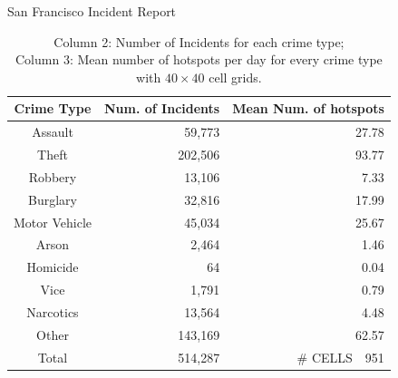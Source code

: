 \documentclass[10pt]{beamer}
\begin{document}
\begin{frame}{San Francisco Incident Report}
\begin{table}[h!]
\centering
\caption{Column 2: Number of Incidents for each crime type;
\\Column 3: Mean number of hotspots per day for every crime type with $40\times 40$ cell grids.}
{\small
 \begin{tabular}{crr} 
 \toprule
 \textbf{Crime Type} & \textbf{Num. of Incidents} & \textbf{Mean Num. of hotspots}\\ [0.5ex] 
 \midrule
Assault & 59,773 &  27.78\\ 
 Theft & 202,506 & 93.77\\
 Robbery & 13,106 & 7.33\\
 Burglary & 32,816  & 17.99\\
 Motor Vehicle & 45,034  & 25.67\\
 Arson & 2,464 & 1.46\\
 Homicide & 64 & 0.04\\
 Vice & 1,791 & 0.79\\
 Narcotics & 13,564 & 4.48\\
 Other & 143,169 & 62.57\\
 \midrule
 Total & 514,287 & \# CELLS~~951\\ [1ex] 
 \bottomrule
 \end{tabular}
 }
 \end{table}
 
\end{frame}
\end{document}
